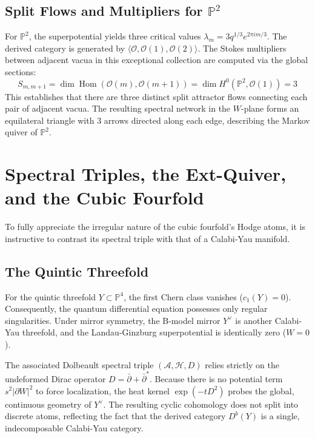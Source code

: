 \documentclass[12pt,reqno]{amsart}
\theoremstyle{remark} \newtheorem{remark}[theorem]{Remark}
\begin{document}
\subsection{Split Flows and Multipliers for $\mathbb{P}^2$}
For $\mathbb{P}^2$, the superpotential yields three critical values
$\lambda_m = 3 q^{1/3} e^{2\pi i m / 3}$. The derived category is
generated by $\langle \mathcal{O}, \mathcal{O}(1), \mathcal{O}(2)
\rangle$. The Stokes multipliers between adjacent vacua in this
exceptional collection are computed via the global sections:
\begin{equation}
    S_{m, m+1} = \dim \operatorname{Hom}(\mathcal{O}(m),
    \mathcal{O}(m+1)) = \dim H^0(\mathbb{P}^2, \mathcal{O}(1)) = 3
\end{equation}
This establishes that there are three distinct split attractor
flows connecting each pair of adjacent vacua. The resulting spectral
network in the $W$-plane forms an equilateral triangle with 3 arrows
directed along each edge, describing the Markov quiver of
$\mathbb{P}^2$.

\section{Spectral Triples, the Ext-Quiver, and the Cubic Fourfold}
To fully appreciate the irregular nature of the cubic fourfold's Hodge
atoms, it is instructive to contrast its spectral triple with that of
a Calabi-Yau manifold.

\subsection{The Quintic Threefold}
For the quintic threefold $Y \subset \mathbb{P}^4$, the first Chern
class vanishes ($c_1(Y) = 0$). Consequently, the quantum differential
equation possesses only regular singularities. Under mirror symmetry,
the B-model mirror $Y^\vee$ is another Calabi-Yau threefold, and the
Landau-Ginzburg superpotential is identically zero ($W = 0$).

The associated Dolbeault spectral triple $(\mathcal{A}, \mathcal{H},
D)$ relies strictly on the undeformed Dirac operator $D =
\bar{\partial} + \bar{\partial}^*$. Because there is no potential term
$s^2 |\partial W|^2$ to force localization, the heat kernel $\exp(-t
D^2)$ probes the global, continuous geometry of $Y^\vee$. The
resulting cyclic cohomology does not split into discrete atoms,
reflecting the fact that the derived category $D^b(Y)$ is a single,
indecomposable Calabi-Yau category.
\end{document}
